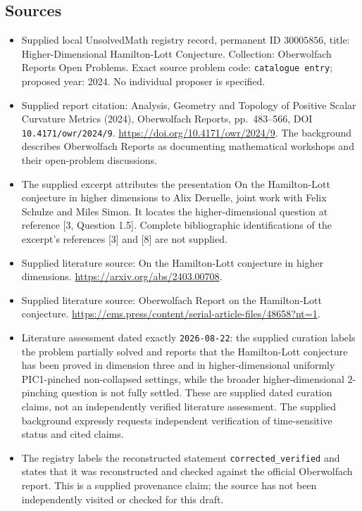 \documentclass[11pt]{article}
\begin{document}
\subsection{Sources}
\begin{itemize}
\item Supplied local UnsolvedMath registry record, permanent ID \(30005856\), title: Higher-Dimensional Hamilton-Lott Conjecture. Collection: Oberwolfach Reports Open Problems. Exact source problem code: \texttt{catalogue entry}; proposed year: 2024. No individual proposer is specified.
\item Supplied report citation: Analysis, Geometry and Topology of Positive Scalar Curvature Metrics (2024), Oberwolfach Reports, pp.\ 483--566, DOI \texttt{10.4171/owr/2024/9}. \url{https://doi.org/10.4171/owr/2024/9}. The background describes Oberwolfach Reports as documenting mathematical workshops and their open-problem discussions.
\item The supplied excerpt attributes the presentation On the Hamilton-Lott conjecture in higher dimensions to Alix Deruelle, joint work with Felix Schulze and Miles Simon. It locates the higher-dimensional question at reference [3, Question 1.5]. Complete bibliographic identifications of the excerpt's references [3] and [8] are not supplied.
\item Supplied literature source: On the Hamilton-Lott conjecture in higher dimensions. \url{https://arxiv.org/abs/2403.00708}.
\item Supplied literature source: Oberwolfach Report on the Hamilton-Lott conjecture. \url{https://ems.press/content/serial-article-files/48658?nt=1}.
\item Literature assessment dated exactly \texttt{2026-08-22}: the supplied curation labels the problem partially solved and reports that the Hamilton-Lott conjecture has been proved in dimension three and in higher-dimensional uniformly PIC1-pinched non-collapsed settings, while the broader higher-dimensional \(2\)-pinching question is not fully settled. These are supplied dated curation claims, not an independently verified literature assessment. The supplied background expressly requests independent verification of time-sensitive status and cited claims.
\item The registry labels the reconstructed statement \texttt{corrected\_verified} and states that it was reconstructed and checked against the official Oberwolfach report. This is a supplied provenance claim; the source has not been independently visited or checked for this draft.
\end{itemize}
\end{document}
